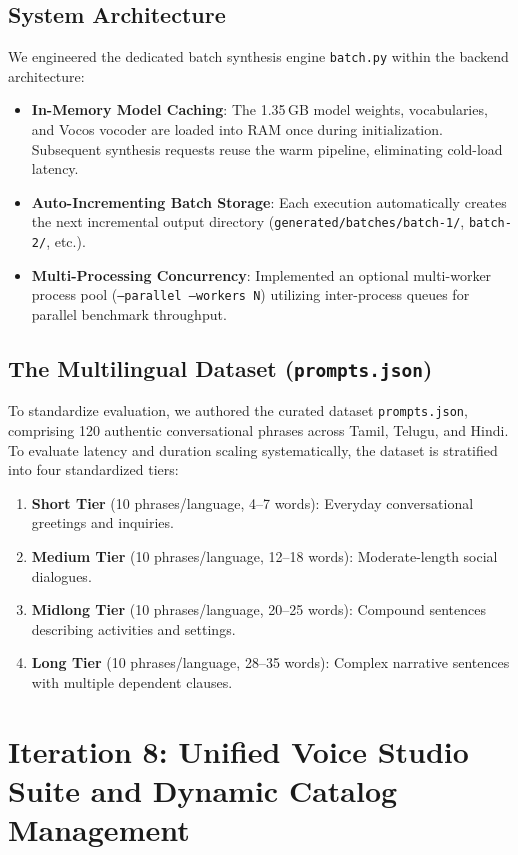 \subsection{System Architecture}
We engineered the dedicated batch synthesis engine \texttt{batch.py} within the backend architecture:
\begin{itemize}
    \item \textbf{In-Memory Model Caching}: The 1.35\,GB model weights, vocabularies, and Vocos vocoder are loaded into RAM once during initialization. Subsequent synthesis requests reuse the warm pipeline, eliminating cold-load latency.
    \item \textbf{Auto-Incrementing Batch Storage}: Each execution automatically creates the next incremental output directory (\texttt{generated/batches/batch-1/}, \texttt{batch-2/}, etc.).
    \item \textbf{Multi-Processing Concurrency}: Implemented an optional multi-worker process pool (\texttt{--parallel --workers N}) utilizing inter-process queues for parallel benchmark throughput.
\end{itemize}

\subsection{The Multilingual Dataset (\texttt{prompts.json})}
To standardize evaluation, we authored the curated dataset \texttt{prompts.json}, comprising 120 authentic conversational phrases across Tamil, Telugu, and Hindi. To evaluate latency and duration scaling systematically, the dataset is stratified into four standardized tiers:
\begin{enumerate}
    \item \textbf{Short Tier} (10 phrases/language, 4--7 words): Everyday conversational greetings and inquiries.
    \item \textbf{Medium Tier} (10 phrases/language, 12--18 words): Moderate-length social dialogues.
    \item \textbf{Midlong Tier} (10 phrases/language, 20--25 words): Compound sentences describing activities and settings.
    \item \textbf{Long Tier} (10 phrases/language, 28--35 words): Complex narrative sentences with multiple dependent clauses.
\end{enumerate}

\section{Iteration 8: Unified Voice Studio Suite and Dynamic Catalog Management}
